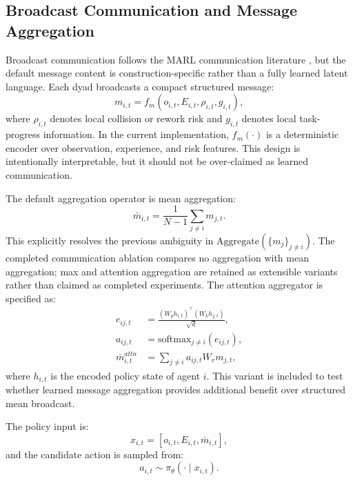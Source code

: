 \documentclass[preprint,12pt]{elsarticle}
\begin{document}
\subsection{Broadcast Communication and Message Aggregation}

Broadcast communication follows the MARL communication literature \cite{Sukhbaatar2016CommNet,Foerster2016DIAL,Jiang2018ATOC,Das2019TarMAC}, but the default message content is construction-specific rather than a fully learned latent language. Each dyad broadcasts a compact structured message:
\begin{equation}
 m_{i,t}=f_m(o_{i,t},E_{i,t},\rho_{i,t},g_{i,t}),
\end{equation}
where $\rho_{i,t}$ denotes local collision or rework risk and $g_{i,t}$ denotes local task-progress information. In the current implementation, $f_m(\cdot)$ is a deterministic encoder over observation, experience, and risk features. This design is intentionally interpretable, but it should not be over-claimed as learned communication.

The default aggregation operator is mean aggregation:
\begin{equation}
\bar{m}_{i,t}=\frac{1}{N-1}\sum_{j\neq i}m_{j,t}.
\label{eq:mean_agg}
\end{equation}
This explicitly resolves the previous ambiguity in $\mathrm{Aggregate}(\{m_j\}_{j\neq i})$. The completed communication ablation compares no aggregation with mean aggregation; max and attention aggregation are retained as extensible variants rather than claimed as completed experiments. The attention aggregator is specified as:
\begin{align}
 e_{ij,t} &= \frac{(W_q h_{i,t})^{\top}(W_k h_{j,t})}{\sqrt{d}},\\
 a_{ij,t} &= \mathrm{softmax}_{j\neq i}(e_{ij,t}),\\
 \bar{m}_{i,t}^{attn} &= \sum_{j\neq i} a_{ij,t} W_v m_{j,t},
\end{align}
where $h_{i,t}$ is the encoded policy state of agent $i$. This variant is included to test whether learned message aggregation provides additional benefit over structured mean broadcast.

The policy input is:
\begin{equation}
 x_{i,t}=[o_{i,t},E_{i,t},\bar{m}_{i,t}],
\end{equation}
and the candidate action is sampled from:
\begin{equation}
 a_{i,t}\sim\pi_{\theta}(\cdot\mid x_{i,t}).
\end{equation}
\end{document}
